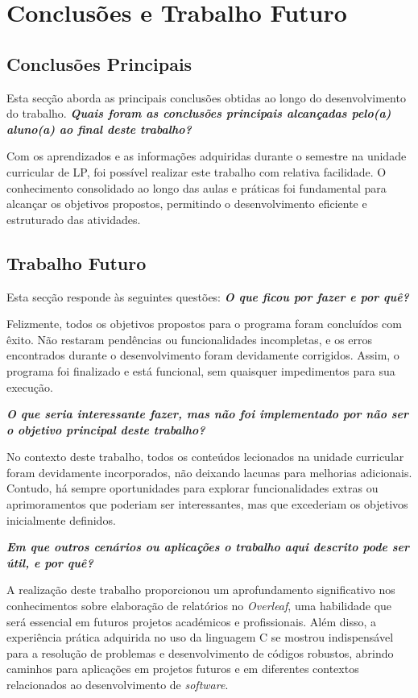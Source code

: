 \chapter{Conclusões e Trabalho Futuro}
\label{chap:conc-trab-futuro}

\section{Conclusões Principais}
\label{sec:conc-princ}

Esta secção aborda as principais conclusões obtidas ao longo do desenvolvimento do trabalho.\newline
\textbf{\emph{Quais foram as conclusões principais alcançadas pelo(a) aluno(a) ao final deste trabalho?}}

Com os aprendizados e as informações adquiridas durante o semestre na unidade curricular de \ac{LP}, foi possível realizar este trabalho com relativa facilidade. O conhecimento consolidado ao longo das aulas e práticas foi fundamental para alcançar os objetivos propostos, permitindo o desenvolvimento eficiente e estruturado das atividades.

\section{Trabalho Futuro}
\label{sec:trab-futuro}

Esta secção responde às seguintes questões:\newline
\textbf{\emph{O que ficou por fazer e por quê?}}

Felizmente, todos os objetivos propostos para o programa foram concluídos com êxito. Não restaram pendências ou funcionalidades incompletas, e os erros encontrados durante o desenvolvimento foram devidamente corrigidos. Assim, o programa foi finalizado e está funcional, sem quaisquer impedimentos para sua execução.

\newpage
\textbf{\emph{O que seria interessante fazer, mas não foi implementado por não ser o objetivo principal deste trabalho?}}

No contexto deste trabalho, todos os conteúdos lecionados na unidade curricular foram devidamente incorporados, não deixando lacunas para melhorias adicionais. Contudo, há sempre oportunidades para explorar funcionalidades extras ou aprimoramentos que poderiam ser interessantes, mas que excederiam os objetivos inicialmente definidos.

\textbf{\emph{Em que outros cenários ou aplicações o trabalho aqui descrito pode ser útil, e por quê?}}

A realização deste trabalho proporcionou um aprofundamento significativo nos conhecimentos sobre elaboração de relatórios no \textit{Overleaf}, uma habilidade que será essencial em futuros projetos académicos e profissionais. Além disso, a experiência prática adquirida no uso da linguagem C se mostrou indispensável para a resolução de problemas e desenvolvimento de códigos robustos, abrindo caminhos para aplicações em projetos futuros e em diferentes contextos relacionados ao desenvolvimento de \textit{software}.